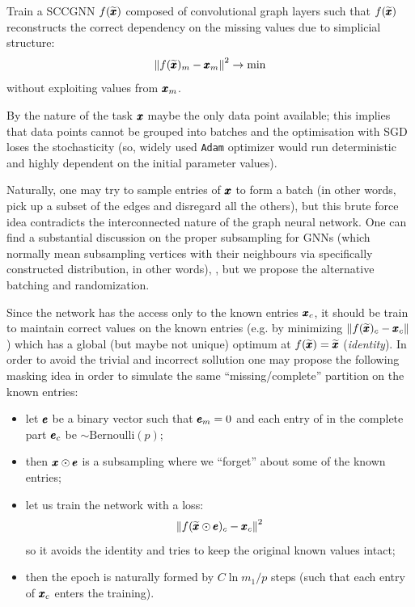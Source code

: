 \documentclass{mynotes}
\begin{document}
\begin{problem}
      Train a SCCGNN \( f(\widetilde{\pmb{x}})\) composed of convolutional graph layers such that \( f(\widetilde{\pmb{x}} )\) reconstructs the correct dependency on the missing values due to simplicial structure: 
      \begin{equation}
            \left\| f(\widetilde{\pmb{x}})_m - \pmb{x}_m  \right\|^2 \to \min
      \end{equation}
      without exploiting values from \( \pmb{x}_m \).
\end{problem}

\begin{remark}
      By the nature of the task \( \pmb{x} \) maybe the only data point available; this implies that data points cannot be grouped into batches and the optimisation with SGD loses the stochasticity (so, widely used \texttt{Adam} optimizer would run deterministic and highly dependent on the initial parameter values). 

      Naturally, one may try to sample entries of \( \pmb{x} \) to form a batch (in other words, pick up a subset of the edges and disregard all the others), but this brute force idea contradicts the interconnected nature of the graph neural network. One can find a substantial discussion on the proper subsampling for GNNs (which normally mean subsampling vertices with their neighbours via specifically constructed distribution, in other words), \cite{huBatchsizeSelectionStochastic2020}, but we propose the alternative batching and randomization.

      Since the network has the access only to the known entries \( \pmb{x}_c\), it should be train to maintain correct values on the known entries (e.g. by minimizing \( \| f(\widetilde{\pmb{x}} )_c - \pmb{x}_c \| \)) which has a global (but maybe not unique) optimum at \( f( \widetilde{\pmb{x}}) = \widetilde{\pmb{x}} \) (\emph{identity}). In order to avoid the trivial and incorrect sollution one may propose the following masking idea in order to simulate the same ``missing/complete'' partition on the known entries:
      \begin{itemize}[itemsep=-5pt]
            \item let \( \pmb{e} \) be a binary vector such that \( \pmb{e}_m = 0 \) and each entry of in the complete part \( \pmb{e}_c \) be \( \sim \mathrm{Bernoulli} \left( p \right) \);
            \item then \( \pmb{x} \odot \pmb{e} \) is a subsampling where we ``forget'' about some of the known entries;
            \item let us train the network with a loss:
            \begin{equation}
                  \left\| f( \widetilde{\pmb{x}} \odot \pmb{e} )_c - \pmb{x}_c \right\|^2 
            \end{equation}
            so it avoids the identity and tries to keep the original known values intact;
            \item then the epoch is naturally formed by \( C \ln m_1 / p \) steps (such that each entry of \( \pmb{x}_c \) enters the training).
      \end{itemize}
\end{remark}
\end{document}
